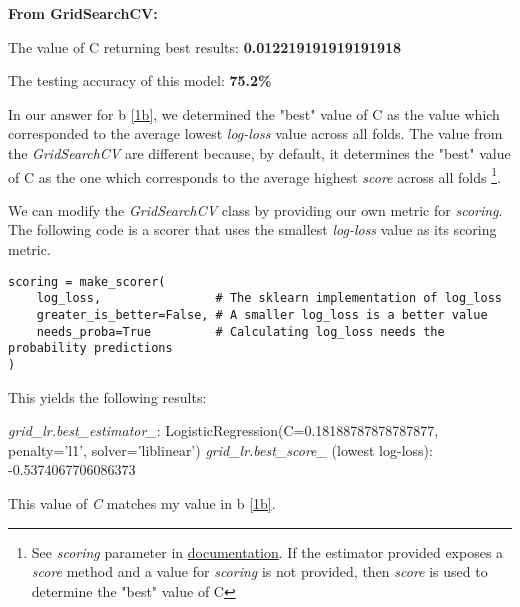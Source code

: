 \documentclass{article}
\begin{document}
\textbf{From GridSearchCV:}

The value of C returning best results: \textbf{0.012219191919191918}

The testing accuracy of this model: \textbf{75.2\%}

In our answer for b \ref{1b}, we determined the "best" value of C as the value which corresponded to the 
average lowest \emph{log-loss} value across all folds. The value from the 
\emph{GridSearchCV} are different because, by default, it determines the 
"best" value of C as the one which corresponds to the average highest \emph{score} 
across all folds 
\footnote{See \emph{scoring} parameter in \href{https://scikit-learn.org/stable/modules/generated/sklearn.model_selection.GridSearchCV.html}{documentation}. 
If the estimator provided exposes a \emph{score} method and a value for 
\emph{scoring} is not provided, then \emph{score} is used to determine the 
"best" value of C}.

We can modify the \emph{GridSearchCV} class by providing our own metric
for \emph{scoring}. The following code is a scorer that uses 
the smallest \emph{log-loss} value as its scoring metric.

\begin{verbatim}
scoring = make_scorer(
    log_loss,                # The sklearn implementation of log_loss
    greater_is_better=False, # A smaller log_loss is a better value
    needs_proba=True         # Calculating log_loss needs the probability predictions 
)
\end{verbatim}

This yields the following results:

\emph{grid\_lr.best\_estimator\_}: LogisticRegression(C=0.18188787878787877, penalty='l1', solver='liblinear')
\emph{grid\_lr.best\_score\_} (lowest log-loss): -0.5374067706086373

This value of \emph{C} matches my value in b \ref{1b}.
\end{document}
